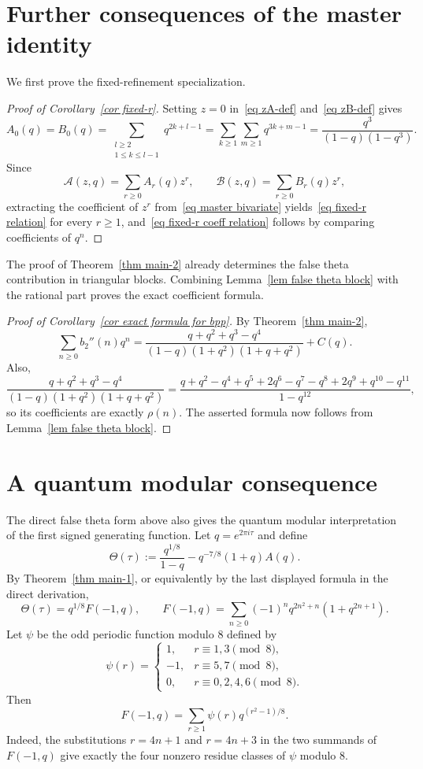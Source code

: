 \documentclass[reqno]{amsart}
\theoremstyle{definition}
\theoremstyle{plain}
\theoremstyle{remark}
\numberwithin{equation}{section}
\begin{document}
\section{Further consequences of the master identity}\label{sec proofs corollaries}
%
We first prove the fixed-refinement specialization.
\begin{proof}[Proof of Corollary~\ref{cor fixed-r}]
Setting $z=0$ in~\eqref{eq zA-def} and~\eqref{eq zB-def} gives
\[
A_0(q)=B_0(q)=\sum_{\substack{l\ge 2\\1\le k\le l-1}} q^{2k+l-1}
=\sum_{k\ge 1}\sum_{m\ge 1} q^{3k+m-1}
=\frac{q^3}{(1-q)(1-q^3)}.
\]
Since
\[
\mathcal A(z,q)=\sum_{r\ge 0}A_r(q)z^r,\qquad \mathcal B(z,q)=\sum_{r\ge 0}B_r(q)z^r,
\]
extracting the coefficient of $z^r$ from~\eqref{eq master bivariate} yields~\eqref{eq fixed-r relation} for every $r\ge 1$, and~\eqref{eq fixed-r coeff relation} follows by comparing coefficients of $q^n$.
\end{proof}

The proof of Theorem~\ref{thm main-2} already determines the false theta contribution in triangular blocks.  Combining Lemma~\ref{lem false theta block} with the rational part proves the exact coefficient formula.

\begin{proof}[Proof of Corollary~\ref{cor exact formula for bpp}]
By Theorem~\ref{thm main-2},
\[
\sum_{n\ge 0} b_2''(n)q^n
=\frac{q+q^2+q^3-q^4}{(1-q)(1+q^2)(1+q+q^2)} + C(q).
\]
Also,
\[
\frac{q+q^2+q^3-q^4}{(1-q)(1+q^2)(1+q+q^2)}
=\frac{q+q^2-q^4+q^5+2q^6-q^7-q^8+2q^9+q^{10}-q^{11}}{1-q^{12}},
\]
so its coefficients are exactly $\rho(n)$.  The asserted formula now follows from Lemma~\ref{lem false theta block}.
\end{proof}


\section{A quantum modular consequence}\label{sec quantum}

The direct false theta form above also gives the quantum modular interpretation of the first signed generating function.  Let $q=e^{2\pi i\tau}$ and define
\[
\Theta(\tau):=\frac{q^{1/8}}{1-q}-q^{-7/8}(1+q)A(q).
\]
By Theorem~\ref{thm main-1}, or equivalently by the last displayed formula in the direct derivation,
\begin{equation}\label{eq theta false theta}
\Theta(\tau)=q^{1/8}F(-1,q),\qquad
F(-1,q)=\sum_{n\ge0}(-1)^nq^{2n^2+n}(1+q^{2n+1}).
\end{equation}
Let $\psi$ be the odd periodic function modulo $8$ defined by
\[
\psi(r)=
\begin{cases}
1, & r\equiv 1,3\pmod 8,\\
-1, & r\equiv 5,7\pmod 8,\\
0, & r\equiv 0,2,4,6\pmod 8.
\end{cases}
\]
Then
\begin{equation}\label{eq psi false theta}
F(-1,q)=\sum_{r\ge1}\psi(r)q^{(r^2-1)/8}.
\end{equation}
Indeed, the substitutions $r=4n+1$ and $r=4n+3$ in the two summands of $F(-1,q)$ give exactly the four nonzero residue classes of $\psi$ modulo $8$.
\end{document}
